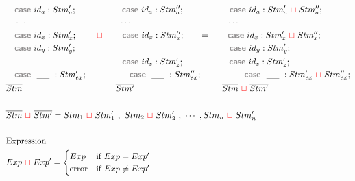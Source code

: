 \documentclass{thesis}
\newcommand{\gray}[1]{\textbf{\textsf{\color{Gray}#1}}}
\newcommand{\mg}{~{\color{red}{\sqcup}}~} %
\begin{document}
\begin{align*}
  & ~~~\gray{case}~id_a : Stm'_a; ~~~~~~~~~~~~~~~~\gray{case}~id_a : Stm''_a; ~~~~~~~~~~~~~~~~\gray{case}~id_a : Stm'_a \mg Stm''_a;\\
  & ~~~\cdots ~~~~~~~~~~~~~~~~~~~~~~~~~~~~~~~~~\cdots ~~~~~~~~~~~~~~~~~~~~~~~~~~~~~~~~~~\cdots\\
  & ~~~\gray{case}~id_x : Stm'_x; ~~~~~~\mg~~~~~~\gray{case}~id_x : Stm''_x; ~~~~~~=~~~~~~\gray{case}~id_x : Stm'_x \mg Stm''_x;\\
  & ~~~\gray{case}~id_y : Stm'_y; ~~~~~~~~~~~~~~~~~~~~~~~~~~~~~~~~~~~~~~~~~~~~~~~~~~~~~~\gray{case}~id_y : Stm'_y; \\
  & ~~~~~~~~~~~~~~~~~~~~~~~~~~~~~~~~~~~~~~~~~\gray{case}~id_z : Stm'_z;~~~~~~~~~~~~~~~~\gray{case}~id_z : Stm'_z;\\
  & ~~~\gray{case}~~\_\_ ~: Stm'_{ex}; ~~~~~~~~~~~~~~~\gray{case}~~\_\_ ~: Stm''_{ex}; ~~~~~~~~~~~~~~~\gray{case}~~\_\_ ~:Stm'_{ex} \mg Stm''_{ex};\\
  & \overline{Stm} ~~~~~~~~~~~~~~~~~~~~~~~~~~~~~~~~~ \overline{Stm'} ~~~~~~~~~~~~~~~~~~~~~~~~~~~~~~~ \overline{Stm} \mg \overline{Stm'}\\
  \\
  & \overline{Stm} \mg \overline{Stm'} = Stm_1 \mg Stm_1'~,~Stm_2 \mg Stm_2'~,~\cdots~,Stm_n \mg Stm'_n\\
  \\
  & \text{Expression}\\
  & Exp \mg Exp' =
  \begin{cases}
    Exp & \text{if}~ Exp = Exp'\\
    \text{error} & \text{if}~ Exp \neq Exp'
  \end{cases}\\
\end{align*}
\end{document}
